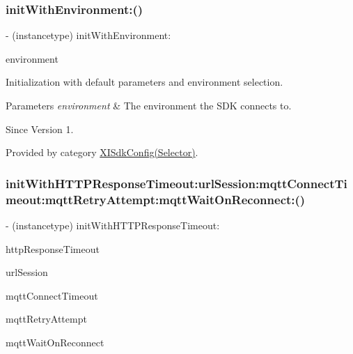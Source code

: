 \subsubsection{\texorpdfstring{init\+With\+Environment\+:()}{initWithEnvironment:()}}
{\footnotesize\ttfamily -\/ (instancetype) init\+With\+Environment\+: \begin{DoxyParamCaption}\item[{(X\+I\+Environment)}]{environment }\end{DoxyParamCaption}}



Initialization with default parameters and environment selection. 


\begin{DoxyParams}{Parameters}
{\em environment} & The environment the S\+DK connects to. \\
\hline
\end{DoxyParams}
\begin{DoxySince}{Since}
Version 1. 
\end{DoxySince}


Provided by category \hyperlink{category_x_i_sdk_config_07_selector_08_aaf78fa6769fee2f17ba641609f112e55}{X\+I\+Sdk\+Config(\+Selector)}.

\hypertarget{class_x_i_sdk_config_aeea5606d1560af2396d135819f5f9596}{}\label{class_x_i_sdk_config_aeea5606d1560af2396d135819f5f9596} 
\subsubsection{\texorpdfstring{init\+With\+H\+T\+T\+P\+Response\+Timeout\+:url\+Session\+:mqtt\+Connect\+Timeout\+:mqtt\+Retry\+Attempt\+:mqtt\+Wait\+On\+Reconnect\+:()}{initWithHTTPResponseTimeout:urlSession:mqttConnectTimeout:mqttRetryAttempt:mqttWaitOnReconnect:()}}
{\footnotesize\ttfamily -\/ (instancetype) init\+With\+H\+T\+T\+P\+Response\+Timeout\+: \begin{DoxyParamCaption}\item[{(long)}]{http\+Response\+Timeout }\item[{urlSession:(N\+S\+U\+R\+L\+Session $\ast$)}]{url\+Session }\item[{mqttConnectTimeout:(long)}]{mqtt\+Connect\+Timeout }\item[{mqttRetryAttempt:(int)}]{mqtt\+Retry\+Attempt }\item[{mqttWaitOnReconnect:(long)}]{mqtt\+Wait\+On\+Reconnect }\end{DoxyParamCaption}}



